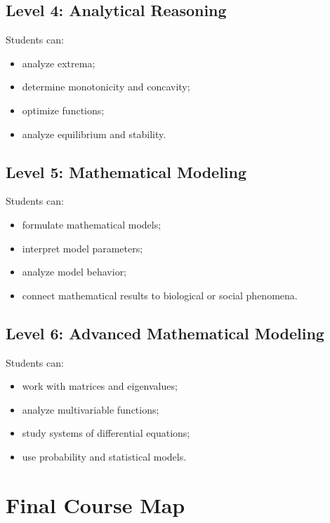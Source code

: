 \documentclass[11pt]{article}
\begin{document}
\subsection{Level 4: Analytical Reasoning}

Students can:

\begin{itemize}
    \item analyze extrema;
    \item determine monotonicity and concavity;
    \item optimize functions;
    \item analyze equilibrium and stability.
\end{itemize}

\subsection{Level 5: Mathematical Modeling}

Students can:

\begin{itemize}
    \item formulate mathematical models;
    \item interpret model parameters;
    \item analyze model behavior;
    \item connect mathematical results to biological or social phenomena.
\end{itemize}

\subsection{Level 6: Advanced Mathematical Modeling}

Students can:

\begin{itemize}
    \item work with matrices and eigenvalues;
    \item analyze multivariable functions;
    \item study systems of differential equations;
    \item use probability and statistical models.
\end{itemize}


\section{Final Course Map}
\end{document}
